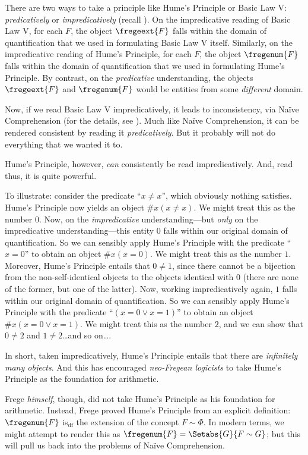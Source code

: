 \documentclass[../../../include/open-logic-section]{subfiles}
\begin{document}
There are two ways to take a principle like Hume's Principle or Basic Law V: \emph{predicatively} or \emph{impredicatively} (recall ). On the impredicative reading of Basic Law V, for each $F$, the object $\fregeext{F}$ falls within the domain of quantification that we used in formulating Basic Law V itself. Similarly, on the impredicative reading of Hume's Principle, for each $F$, the object $\fregenum{F}$ falls within the domain of quantification that we used in formulating Hume's Principle. By contrast, on the \emph{predicative} understanding, the objects $\fregeext{F}$ and $\fregenum{F}$ would be entities from some \emph{different} domain. 

Now, if we read Basic Law V impredicatively, it leads to inconsistency, via Na\"ive Comprehension (for the details, see ). Much like Na\"ive Comprehension, it can be rendered consistent by reading it \emph{predicatively}. But it probably will not do everything that we wanted it to. 

Hume's Principle, however, \emph{can} consistently be read impredicatively. And, read thus, it is quite powerful.

To illustrate: consider the predicate ``$x \neq x$'', which obviously nothing satisfies. Hume's Principle now yields an object $\# x( x\neq x)$. We might treat this as the number $0$. Now, on the \emph{impredicative} understanding---but \emph{only} on the impredicative understanding---this entity $0$ falls within our original domain of quantification. So we can sensibly apply Hume's Principle with the predicate ``$x = 0$'' to obtain an object $\#x (x = 0)$. We might treat this as the number $1$. Moreover, Hume's Principle entails that $0 \neq 1$, since there cannot be a bijection from the non-self-identical objects to the objects identical with $0$ (there are none of the former, but one of the latter). Now, working impredicatively again, $1$ falls within our original domain of quantification. So we can sensibly apply Hume's Principle with the predicate ``$(x = 0 \lor x = 1)$'' to obtain an object $\#x(x = 0 \lor x = 1)$. We might treat this as the number $2$, and we can show that $0\neq 2$ and $1 \neq 2$\ldots and so on\ldots. 

In short, taken impredicatively, Hume's Principle entails that there are \emph{infinitely many objects}. And this has encouraged \emph{neo-Fregean logicists} to take Hume's Principle as the foundation for arithmetic. 

Frege \emph{himself}, though, did not take Hume's Principle as his foundation for arithmetic. Instead, Frege proved Hume's Principle from an explicit definition: $\fregenum{F}$ is$_\text{df}$ the extension of the concept $F \sim \Phi$. In modern terms, we might attempt to render this as $\fregenum{F} = \Setabs{G}{F \sim G}$; but this will pull us back into the problems of Na\"ive Comprehension.
\end{document}
